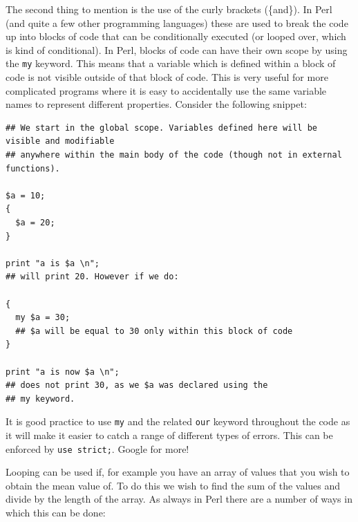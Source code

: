 \documentclass[11pt]{article}
\begin{document}
The second thing to mention is the use of the curly brackets (\{and\}). In
Perl (and quite a few other programming languages) these are used to
break the code up into blocks of code that can be conditionally executed
(or looped over, which is kind of conditional). In Perl, blocks of code
can have their own scope by using the \texttt{my} keyword. This means that a
variable which is defined within a block of code is not visible outside
of that block of code. This is very useful for more complicated programs
where it is easy to accidentally use the same variable names to represent
different properties.
Consider the following snippet:

\begin{verbatim}
## We start in the global scope. Variables defined here will be visible and modifiable
## anywhere within the main body of the code (though not in external functions).

$a = 10;
{
  $a = 20;
}

print "a is $a \n";
## will print 20. However if we do:

{
  my $a = 30;
  ## $a will be equal to 30 only within this block of code
}

print "a is now $a \n";
## does not print 30, as we $a was declared using the
## my keyword.
\end{verbatim}

It is good practice to use \texttt{my} and the related \texttt{our} keyword throughout
the code as it will make it easier to catch a range of different types
of errors. This can be enforced by \texttt{use strict;}. Google for more!

Looping can be used if, for example you have an array of values that you wish to
obtain the mean value of. To do this we wish to find the sum of the
values and divide by the length of the array. As always in Perl there
are a number of ways in which this can be done:
\end{document}
